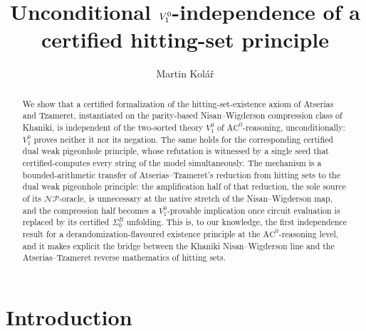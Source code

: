 \documentclass[11pt]{article}
\title{Unconditional $\Vone$-independence of a certified hitting-set principle}
\author{%
  Martin Kolář%
}
\date{}
\theoremstyle{definition}
\theoremstyle{remark}
\newcommand{\NP}{\mathscr{N\!P}}
\newcommand{\Vone}{V^0_1}
\newcommand{\SigmaB}{\Sigma^B_0}
\begin{document}
\maketitle

\begin{abstract}
We show that a certified formalization of the hitting-set-existence axiom of
Atserias and Tzameret, instantiated on the parity-based Nisan--Wigderson
compression class of Khaniki, is independent of the two-sorted theory $\Vone$
of $\mathrm{AC}^0$-reasoning, unconditionally: $\Vone$ proves neither it nor
its negation. The same holds for the corresponding certified dual weak
pigeonhole principle, whose refutation is witnessed by a single seed that
certified-computes every string of the model simultaneously. The mechanism is
a bounded-arithmetic transfer of Atserias--Tzameret's reduction from hitting
sets to the dual weak pigeonhole principle: the amplification half of that
reduction, the sole source of its $\NP$-oracle, is unnecessary at the native
stretch of the Nisan--Wigderson map, and the compression half becomes a
$\Vone$-provable implication once circuit evaluation is replaced by its
certified $\SigmaB$ unfolding. This is, to our knowledge, the first
independence result for a derandomization-flavoured existence principle at the
$\mathrm{AC}^0$-reasoning level, and it makes explicit the bridge between the
Khaniki Nisan--Wigderson line and the Atserias--Tzameret reverse mathematics
of hitting sets.
\end{abstract}

\section*{Introduction}
\end{document}
